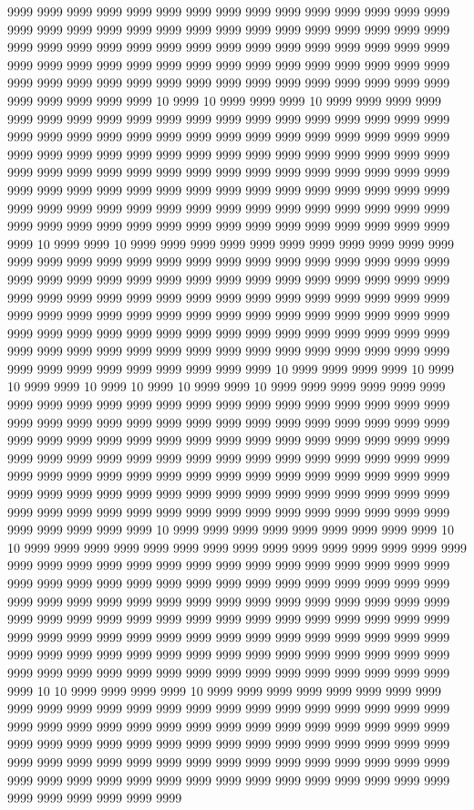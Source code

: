 9999 9999 9999 9999 9999 9999 9999 9999 9999 9999 9999 9999 9999 9999 9999 9999 9999 9999 9999 9999 9999 9999 9999 9999 9999 9999 9999 9999 9999 9999 9999 9999 9999 9999 9999 9999 9999 9999 9999 9999 9999 9999 9999 9999 9999 9999 9999 9999 9999 9999 9999 9999 9999 9999 9999 9999 9999 9999 9999 9999 9999 9999 9999 9999 9999 9999 9999 9999 9999 9999 9999 9999 9999 9999 9999 9999 9999 9999 9999 9999 10 9999 10 9999 9999 9999 10 9999 9999 9999 9999 9999 9999 9999 9999 9999 9999 9999 9999 9999 9999 9999 9999 9999 9999 9999 9999 9999 9999 9999 9999 9999 9999 9999 9999 9999 9999 9999 9999 9999 9999 9999 9999 9999 9999 9999 9999 9999 9999 9999 9999 9999 9999 9999 9999 9999 9999 9999 9999 9999 9999 9999 9999 9999 9999 9999 9999 9999 9999 9999 9999 9999 9999 9999 9999 9999 9999 9999 9999 9999 9999 9999 9999 9999 9999 9999 9999 9999 9999 9999 9999 9999 9999 9999 9999 9999 9999 9999 9999 9999 9999 9999 9999 9999 9999 9999 9999 9999 9999 9999 9999 9999 9999 9999 9999 9999 9999 10 9999 9999 10 9999 9999 9999 9999 9999 9999 9999 9999 9999 9999 9999 9999 9999 9999 9999 9999 9999 9999 9999 9999 9999 9999 9999 9999 9999 9999 9999 9999 9999 9999 9999 9999 9999 9999 9999 9999 9999 9999 9999 9999 9999 9999 9999 9999 9999 9999 9999 9999 9999 9999 9999 9999 9999 9999 9999 9999 9999 9999 9999 9999 9999 9999 9999 9999 9999 9999 9999 9999 9999 9999 9999 9999 9999 9999 9999 9999 9999 9999 9999 9999 9999 9999 9999 9999 9999 9999 9999 9999 9999 9999 9999 9999 9999 9999 9999 9999 9999 9999 9999 9999 9999 9999 9999 9999 9999 9999 9999 9999 9999 9999 10 9999 9999 9999 9999 10 9999 10 9999 9999 10 9999 10 9999 10 9999 9999 10 9999 9999 9999 9999 9999 9999 9999 9999 9999 9999 9999 9999 9999 9999 9999 9999 9999 9999 9999 9999 9999 9999 9999 9999 9999 9999 9999 9999 9999 9999 9999 9999 9999 9999 9999 9999 9999 9999 9999 9999 9999 9999 9999 9999 9999 9999 9999 9999 9999 9999 9999 9999 9999 9999 9999 9999 9999 9999 9999 9999 9999 9999 9999 9999 9999 9999 9999 9999 9999 9999 9999 9999 9999 9999 9999 9999 9999 9999 9999 9999 9999 9999 9999 9999 9999 9999 9999 9999 9999 9999 9999 9999 9999 9999 9999 9999 9999 9999 9999 9999 9999 9999 9999 9999 9999 9999 9999 9999 9999 9999 9999 9999 9999 9999 9999 9999 10 9999 9999 9999 9999 9999 9999 9999 9999 9999 10 10 9999 9999 9999 9999 9999 9999 9999 9999 9999 9999 9999 9999 9999 9999 9999 9999 9999 9999 9999 9999 9999 9999 9999 9999 9999 9999 9999 9999 9999 9999 9999 9999 9999 9999 9999 9999 9999 9999 9999 9999 9999 9999 9999 9999 9999 9999 9999 9999 9999 9999 9999 9999 9999 9999 9999 9999 9999 9999 9999 9999 9999 9999 9999 9999 9999 9999 9999 9999 9999 9999 9999 9999 9999 9999 9999 9999 9999 9999 9999 9999 9999 9999 9999 9999 9999 9999 9999 9999 9999 9999 9999 9999 9999 9999 9999 9999 9999 9999 9999 9999 9999 9999 9999 9999 9999 9999 9999 9999 9999 9999 9999 9999 9999 9999 9999 9999 9999 9999 9999 9999 9999 10 10 9999 9999 9999 9999 10 9999 9999 9999 9999 9999 9999 9999 9999 9999 9999 9999 9999 9999 9999 9999 9999 9999 9999 9999 9999 9999 9999 9999 9999 9999 9999 9999 9999 9999 9999 9999 9999 9999 9999 9999 9999 9999 9999 9999 9999 9999 9999 9999 9999 9999 9999 9999 9999 9999 9999 9999 9999 9999 9999 9999 9999 9999 9999 9999 9999 9999 9999 9999 9999 9999 9999 9999 9999 9999 9999 9999 9999 9999 9999 9999 9999 9999 9999 9999 9999 9999 9999 9999 9999 9999 9999 9999 9999 9999 